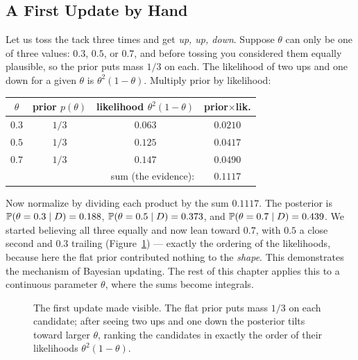 \subsection{A First Update by Hand}

Let us toss the tack three times and get \emph{up, up, down}. Suppose $\theta$ can only be one of three values:
$0.3$, $0.5$, or $0.7$, and before tossing you considered them equally plausible, so the
prior puts mass $1/3$ on each. The likelihood of two ups and one down for a given $\theta$
is $\theta^2(1-\theta)$. Multiply prior by likelihood:

\begin{center}
\begin{tabular}{cccc}
\toprule
$\theta$ & prior $p(\theta)$ & likelihood $\theta^2(1-\theta)$ & prior$\times$lik. \\
\midrule
$0.3$ & $1/3$ & $0.063$ & $0.0210$ \\
$0.5$ & $1/3$ & $0.125$ & $0.0417$ \\
$0.7$ & $1/3$ & $0.147$ & $0.0490$ \\
\midrule
\multicolumn{3}{r}{sum (the evidence):} & $0.1117$ \\
\bottomrule
\end{tabular}
\end{center}

Now normalize by dividing each product by the sum $0.1117$. The posterior is
$\operatorname{\mathbb{P}}(\theta=0.3\mid D) = 0.188$, $\operatorname{\mathbb{P}}(\theta=0.5\mid D)=0.373$, and
$\operatorname{\mathbb{P}}(\theta=0.7\mid D)=0.439$. We started believing all three equally and now lean toward
$0.7$, with $0.5$ a close second and $0.3$ trailing (Figure~\ref{ch31:fig-discrete}) ---
exactly the ordering of the
likelihoods, because here the flat prior contributed nothing to the \emph{shape}. This demonstrates the mechanism of Bayesian updating. The rest of this chapter applies this to a continuous
parameter $\theta$, where the sums become integrals.

\begin{figure}[H]
\centering
{}
\caption{The first update made visible. The flat prior puts mass $1/3$ on each candidate;
after seeing two ups and one down the posterior tilts toward larger $\theta$, ranking the
candidates in exactly the order of their likelihoods $\theta^2(1-\theta)$.}
\label{ch31:fig-discrete}
\end{figure}

